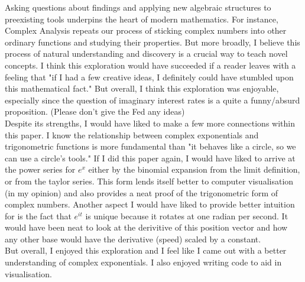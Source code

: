 \documentclass[11pt,a4paper]{article}
\begin{document}
Asking questions about findings and applying new algebraic structures to preexisting tools underpins the heart of modern mathematics. For instance, Complex Analysis repeats our process of sticking complex numbers into other ordinary functions and studying their properties. But more broadly, I believe this process of natural understanding and discovery is a crucial way to teach novel concepts. I think this exploration would have succeeded if a reader leaves with a feeling that "if I had a few creative ideas, I definitely could have stumbled upon this mathematical fact." But overall, I think this exploration was enjoyable, especially since the question of imaginary interest rates is a quite a funny/absurd proposition.  (Please don't give the Fed any ideas)\\
Despite its strengths, I would have liked to make a few more connections within this paper. I know the relationship between complex exponentials and trigonometric functions is more fundamental than "it behaves like a circle, so we can use a circle's tools." If I did this paper again, I would have liked to arrive at the power series for $e^x$ either by the binomial expansion from the limit definition, or from the taylor series. This form lends itself better to computer visualisation (in my opinion) and also provides a neat proof of the trigonometric form of complex numbers. Another aspect I would have liked to provide better intuition for is the fact that $e^{it}$ is unique because it rotates at one radian per second. It would have been neat to look at the derivitive of this position vector and how any other base would have the derivative (speed) scaled by a constant. \\
But overall, I enjoyed this exploration and I feel like I came out with a better understanding of complex exponentials. I also enjoyed writing code to aid in visualisation.
\end{document}
